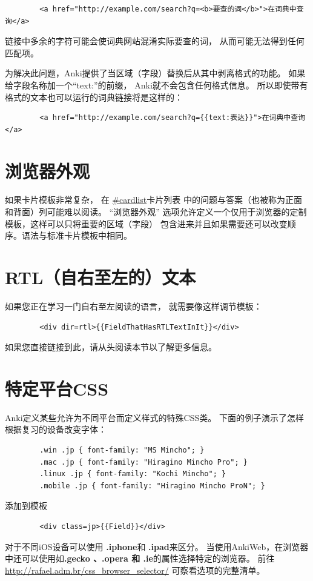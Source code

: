 \documentclass[a4paper]{book}
\begin{document}
	\begin{shaded}\begin{verbatim}
		<a href="http://example.com/search?q=<b>要查的词</b>">在词典中查询</a>
		\end{verbatim}\end{shaded}
	链接中多余的字符可能会使词典网站混淆实际要查的词， 从而可能无法得到任何匹配项。
	
	为解决此问题，Anki提供了当区域（字段）替换后从其中剥离格式的功能。 如果给字段名称加一个“text:”的前缀， Anki就不会包含任何格式信息。 所以即使带有格式的文本也可以运行的词典链接将是这样的：
	
	\begin{shaded}\begin{verbatim}
		<a href="http://example.com/search?q={{text:表达}}">在词典中查询</a>
		\end{verbatim}\end{shaded}
	\section{浏览器外观}
	如果卡片模板非常复杂， 在 \url{#cardlist}卡片列表 中的问题与答案（也被称为正面和背面）列可能难以阅读。 “浏览器外观” 选项允许定义一个仅用于浏览器的定制模板，这样可以只将重要的区域（字段） 包含进来并且如果需要还可以改变顺序。语法与标准卡片模板中相同。
	
	\section{RTL（自右至左的）文本}
	如果您正在学习一门自右至左阅读的语言， 就需要像这样调节模板：
	
	\begin{shaded}\begin{verbatim}
		<div dir=rtl>{{FieldThatHasRTLTextInIt}}</div>
		\end{verbatim}\end{shaded}
	如果您直接链接到此，请从头阅读本节以了解更多信息。
	
	\section{特定平台CSS}
	Anki定义某些允许为不同平台而定义样式的特殊CSS类。 下面的例子演示了怎样根据复习的设备改变字体：
	
	\begin{shaded}\begin{verbatim}
		.win .jp { font-family: "MS Mincho"; }
		.mac .jp { font-family: "Hiragino Mincho Pro"; }
		.linux .jp { font-family: "Kochi Mincho"; }
		.mobile .jp { font-family: "Hiragino Mincho ProN"; }
		\end{verbatim}\end{shaded}
	添加到模板
	\begin{shaded}\begin{verbatim}
		<div class=jp>{{Field}}</div>
		\end{verbatim}\end{shaded}
	对于不同iOS设备可以使用 \textbf{.iphone}和 \textbf{.ipad}来区分。
	当使用AnkiWeb，在浏览器中还可以使用如\textbf{.gecko 、\textbf{.opera} 和 .ie}的属性选择特定的浏览器。 前往 \url{http://rafael.adm.br/css_browser_selector/} 可察看选项的完整清单。
	
\end{document}
